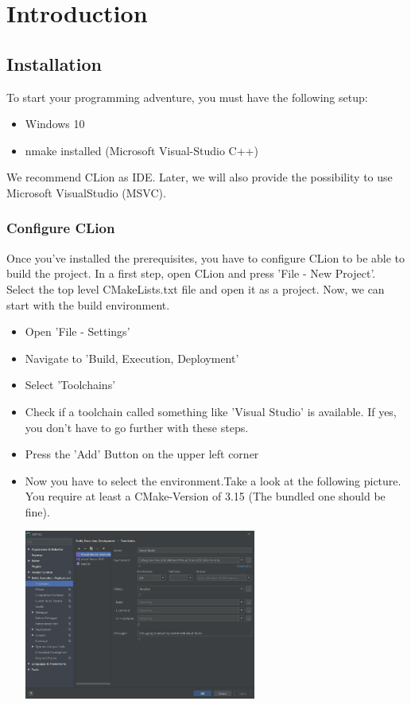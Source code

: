 \newpage
\chapter{Introduction}
\section{Installation}
To start your programming adventure, you must have the following setup:
\begin{itemize}
    \item Windows 10
    \item \gls{nmake} installed (Microsoft Visual-Studio C++)
\end{itemize}
We recommend CLion as IDE. Later, we will also provide the possibility to use Microsoft VisualStudio (MSVC).
\subsection{Configure CLion}
Once you've installed the prerequisites, you have to configure CLion to be able to build the project.
In a first step, open CLion and press 'File - New Project'.
Select the top level CMakeLists.txt file and open it as a project.
Now, we can start with the build environment.
\begin{itemize}
    \item Open 'File - Settings'
    \item Navigate to 'Build, Execution, Deployment'
    \item Select 'Toolchains'
    \item Check if a toolchain called something like 'Visual Studio' is available.
    If yes, you don't have to go further with these steps.
    \item Press the 'Add' Button on the upper left corner
    \item Now you have to select the environment.Take a look at the following picture.
    You require at least a CMake-Version of 3.15 (The bundled one should be fine).\par
    \begin{minipage}{\linewidth}
        \centering
        \includegraphics[width=0.6\textwidth]{./chapter_01/resources/00_clion_configure_toolchain.png}
    \end{minipage}
\end{itemize}
